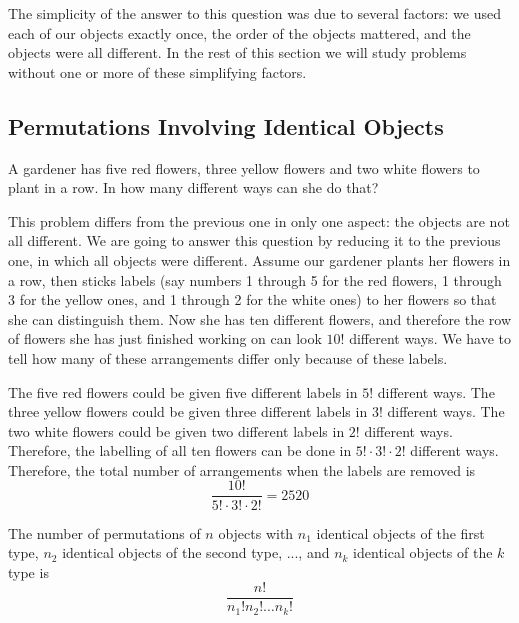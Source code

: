 \documentclass[11pt,a4paper]{book}
\begin{document}
The simplicity of the answer to this question was due to several
factors: we used each of our objects exactly once, the order of the
objects mattered, and the objects were all different. In the rest
of this section we will study problems without one or more of these
simplifying factors.

\subsection{Permutations Involving Identical Objects}

\begin{example}

A gardener has five red flowers, three yellow flowers and two white
flowers to plant in a row. In how many different ways can she do that?

\Solution

This problem differs from the previous one in only one aspect: the
objects are not all different. We are going to answer this question
by reducing it to the previous one, in which all objects were different.
Assume our gardener plants her flowers in a row, then sticks labels
(say numbers 1 through 5 for the red flowers, 1 through 3 for the
yellow ones, and 1 through 2 for the white ones) to her flowers so
that she can distinguish them. Now she has ten different flowers,
and therefore the row of flowers she has just finished working on
can look $10!$ different ways. We have to tell how many of these
arrangements differ only because of these labels.

The five red flowers could be given five different labels in $5!$
different ways. The three yellow flowers could be given three different
labels in $3!$ different ways. The two white flowers could be given
two different labels in $2!$ different ways. Therefore, the labelling
of all ten flowers can be done in $5!\cdot3!\cdot2!$ different ways.
Therefore, the total number of arrangements when the labels are removed
is
\[
\frac{10!}{5!\cdot3!\cdot2!}=2520
\]

\end{example}


\medskip{}

\begin{tcolorbox}[colback=blue!5, colframe=black, boxrule=.4pt, sharpish corners]

The number of permutations of $n$ objects with $n_{1}$ identical
objects of the first type, $n_{2}$ identical objects of the second
type, ..., and $n_{k}$ identical objects of the $k$ type is
\[
\frac{n!}{n_{1}!n_{2}!\ldots n_{k}!}
\]
\end{tcolorbox}
\end{document}
